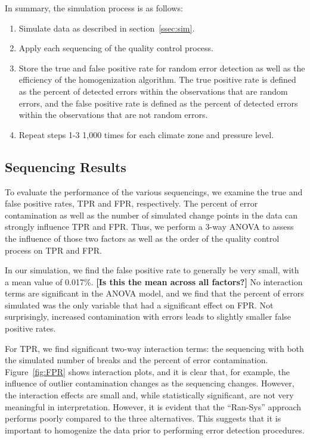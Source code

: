 \documentclass[12pt]{article}
\begin{document}
\begin{doublespacing}
In summary, the simulation process is as follows:

\begin{enumerate}
	\item Simulate data as described in section~\ref{ssec:sim}.
	\item Apply each sequencing of the quality control process.
	\item Store the true and false positive rate for random error detection as well as the efficiency of the homogenization algorithm.  The true positive rate is defined as the percent of detected errors within the observations that are random errors, and the false positive rate is defined as the percent of detected errors within the observations that are not random errors.
	\item Repeat steps 1-3 1,000 times for each climate zone and pressure level.
\end{enumerate}

\subsection{Sequencing Results}

To evaluate the performance of the various sequencings, we examine the true and false positive rates, TPR and FPR, respectively.  The percent of error contamination as well as the number of simulated change points in the data can strongly influence TPR and FPR.  Thus, we perform a 3-way ANOVA to assess the influence of those two factors as well as the order of the quality control process on TPR and FPR.

In our simulation, we find the false positive rate to generally be very small, with a mean value of 0.017\%. \textbf{[Is this the mean across all factors?]}  No interaction terms are significant in the ANOVA model, and we find that the percent of errors simulated was the only variable that had a significant effect on FPR.  Not surprisingly, increased contamination with errors leads to slightly smaller false positive rates.

For TPR, we find significant two-way interaction terms: the sequencing with both the simulated number of breaks and the percent of error contamination.  Figure~\ref{fig:FPR} shows interaction plots, and it is clear that, for example, the influence of outlier contamination changes as the sequencing changes.  However, the interaction effects are small and, while statistically significant, are not very meaningful in interpretation.  However, it is evident that the ``Ran-Sys'' approach performs poorly compared to the three alternatives.  This suggests that it is important to homogenize the data prior to performing error detection procedures.


\end{doublespacing}
\end{document}
